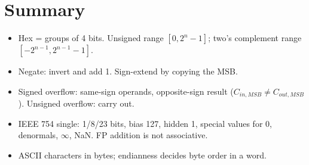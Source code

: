 \section*{Summary}
\begin{itemize}
  \item Hex = groups of 4 bits. Unsigned range $[0, 2^n - 1]$; two's
    complement range $[-2^{n-1}, 2^{n-1}-1]$.
  \item Negate: invert and add 1. Sign-extend by copying the MSB.
  \item Signed overflow: same-sign operands, opposite-sign result
    ($C_{in,MSB} \ne C_{out,MSB}$). Unsigned overflow: carry out.
  \item IEEE 754 single: 1/8/23 bits, bias 127, hidden 1, special values
    for 0, denormals, $\infty$, NaN. FP addition is not associative.
  \item ASCII characters in bytes; endianness decides byte order in a word.
\end{itemize}
